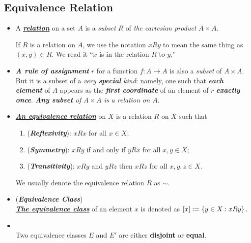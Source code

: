 \documentclass[11pt]{article}
\begin{document}
\subsection{Equivalence Relation}
\begin{itemize}
\item \begin{definition}
A \underline{\emph{\textbf{relation}}} on a set $A$ is a \emph{subset} $R$ of \emph{the cartesian product} $A \times A$.

If $R$ is a relation on $A$, we use the notation $xRy$ to mean the same thing as $(x, y) \in R$. We read it ``$x$ is in the relation $R$ to $y$."
\end{definition}

\item \begin{remark}
\emph{\textbf{A rule of assignment}} $r$ for a function $f: A \rightarrow A$ is also a \emph{subset} of $A \times A$. But it is a subset of a \emph{very \textbf{special} kind}: namely, one such that \emph{\textbf{each element}} of $A$ appears as the \emph{\textbf{first coordinate}} of an element of $r$ \emph{\textbf{exactly once}}. \emph{\textbf{Any subset} of $A \times A$ is a relation on $A$}.
\end{remark}

\item \begin{definition}
\underline{\emph{\textbf{An equivalence relation}}} on $X$ is a relation $R$ on $X$ such that 
\begin{enumerate}
\item (\emph{\textbf{Reflexivity}}): $xRx$ for all $x \in X$;
\item (\emph{\textbf{Symmetry}}): $xRy$ if and only if $yRx$ for all $x,y \in X$;
\item (\emph{\textbf{Transitivity}}): $xRy$ and $yRz$ then $xRz$ for all $x,y,z \in X$. 
\end{enumerate}
We usually denote the equivalence relation $R$ as $\sim$. 
\end{definition}

\item \begin{definition} (\emph{\textbf{Equivalence Class}})\\
\underline{\emph{\textbf{The equivalence class}}} of an element $x$ is denoted as $[x] := \left\{y \in X:  xRy\right\}$. 
\end{definition}

\item \begin{lemma} \citep{munkres2000topology}\\
Two equivalence classes $E$ and $E'$ are either \textbf{disjoint} or \textbf{equal}.
\end{lemma}



\end{itemize}
\end{document}
